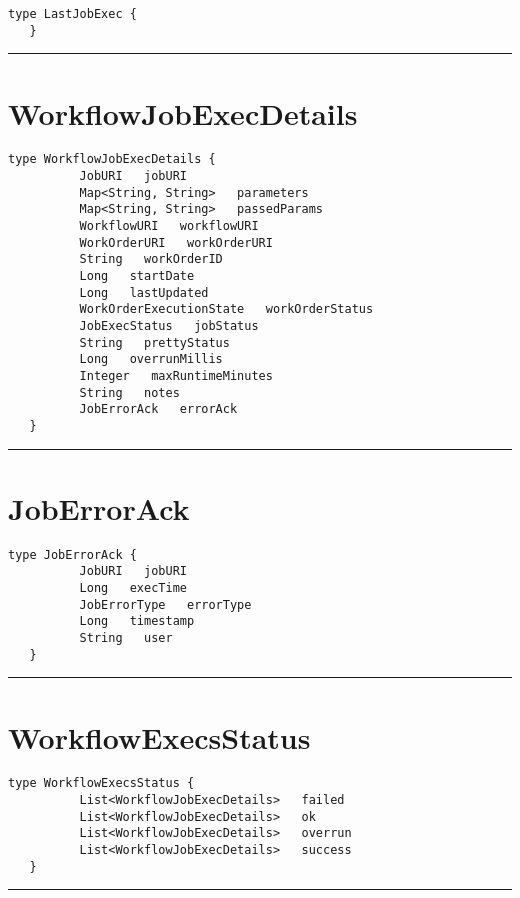 \begin{lstlisting}[style=nonumbers]
   type LastJobExec {
   }
\end{lstlisting}

\rule{12cm}{2pt}
\section{WorkflowJobExecDetails}
\label{type:WorkflowJobExecDetails}

\begin{lstlisting}[style=nonumbers]
   type WorkflowJobExecDetails {
          JobURI   jobURI
          Map<String, String>   parameters
          Map<String, String>   passedParams
          WorkflowURI   workflowURI
          WorkOrderURI   workOrderURI
          String   workOrderID
          Long   startDate
          Long   lastUpdated
          WorkOrderExecutionState   workOrderStatus
          JobExecStatus   jobStatus
          String   prettyStatus
          Long   overrunMillis
          Integer   maxRuntimeMinutes
          String   notes
          JobErrorAck   errorAck
   }
\end{lstlisting}

\rule{12cm}{2pt}
\section{JobErrorAck}
\label{type:JobErrorAck}

\begin{lstlisting}[style=nonumbers]
   type JobErrorAck {
          JobURI   jobURI
          Long   execTime
          JobErrorType   errorType
          Long   timestamp
          String   user
   }
\end{lstlisting}

\rule{12cm}{2pt}
\section{WorkflowExecsStatus}
\label{type:WorkflowExecsStatus}

\begin{lstlisting}[style=nonumbers]
   type WorkflowExecsStatus {
          List<WorkflowJobExecDetails>   failed
          List<WorkflowJobExecDetails>   ok
          List<WorkflowJobExecDetails>   overrun
          List<WorkflowJobExecDetails>   success
   }
\end{lstlisting}

\rule{12cm}{2pt}
